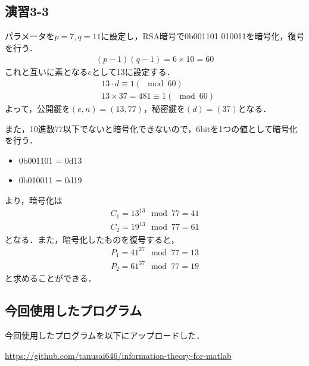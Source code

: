 \documentclass[documentclass]{jsarticle}
\begin{document}


\subsection*{演習3-3}
パラメータを$p=7, q=11$に設定し，RSA暗号で0b001101 010011を暗号化，復号を行う．
\begin{align}
  (p-1)(q-1) = 6 \times 10 = 60
\end{align}
これと互いに素となる$e$として13に設定する．
\begin{align}
&13 \cdot d \equiv 1(\mod60)\\
&13 \times 37 = 481 \equiv 1(\mod60)
\end{align}
よって，公開鍵を$(e,n)=(13,77)$，秘密鍵を$(d)=(37)$となる．

また，10進数77以下でないと暗号化できないので，6bitを1つの値として暗号化を行う．
\begin{itemize}
  \item 0b001101 = 0d13
  \item 0b010011 = 0d19
\end{itemize}
より，暗号化は
\begin{align}
  C_1 = 13^{13} \mod 77 = 41\\
  C_2 = 19^{13} \mod 77 = 61
\end{align}
となる．また，暗号化したものを復号すると，
\begin{align}
  P_1 = 41^{37} \mod 77 = 13\\
  P_2 = 61^{37} \mod 77 = 19
\end{align}
と求めることができる．

\newpage

\subsection*{今回使用したプログラム}
今回使用したプログラムを以下にアップロードした．

\url{https://github.com/tanusai646/information-theory-for-matlab}
\end{document}
